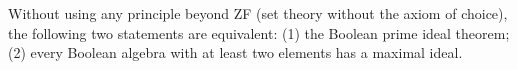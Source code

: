 Without using any principle beyond ZF (set theory without the axiom of choice), the following two statements are equivalent:
(1) the Boolean prime ideal theorem;
(2) every Boolean algebra with at least two elements has a maximal ideal.
